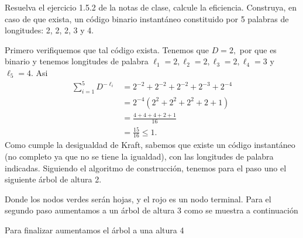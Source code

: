 
Resuelva el ejercicio 1.5.2 de la notas de clase, calcule la eficiencia.
Construya, en caso de que exista, un código binario instantáneo constituido por 5 palabras de longitudes: 2, 2, 2, 3 y 4.
\begin{sols}
    Primero verifiquemos que tal código exista. Tenemos que $D=2,$ por que es binario y tenemos longitudes de palabra $\ell_1=2,\ell_2=2, \ell_3=2, \ell_4=3$ y $\ell_5=4.$ Asi
    \begin{align*}
        \sum_{i=1}^5 D^{-\ell_i}&=2^{-2}+2^{-2}+2^{-2}+2^{-3}+2^{-4}\\
        &=2^{-4}(2^2+2^2+2^2+2+1)\\
        &=\frac{4+4+4+2+1}{16}\\
        &=\frac{15}{16}\leq 1.
    \end{align*}
    Como cumple la desigualdad de Kraft, sabemos que existe un código instantáneo (no completo ya que no se tiene la igualdad), con las longitudes de palabra indicadas. Siguiendo el algoritmo de construcción, tenemos para el paso uno el siguiente árbol de altura 2.
    \begin{center}
    \end{center}
Donde los nodos verdes serán hojas, y el rojo es un nodo terminal. Para el segundo paso aumentamos a un árbol de altura 3 como se muestra a continuación
\begin{center}
    \end{center}
Para finalizar aumentamos el árbol a una altura 4 


\end{sols}
